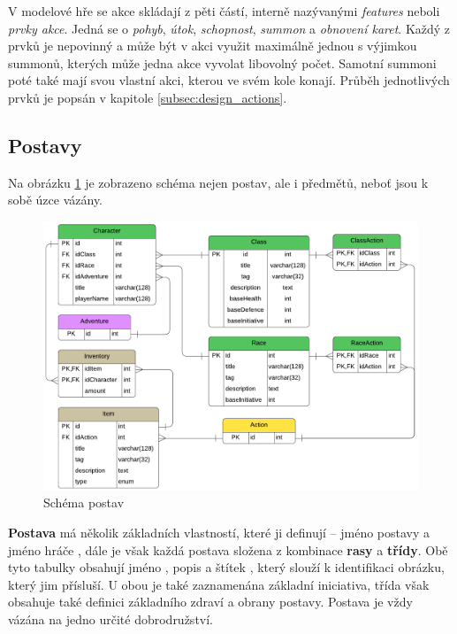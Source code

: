 V modelové hře se akce skládají z pěti částí, interně nazývanými \textit{features} neboli \textit{prvky akce}. Jedná se o \textit{pohyb}, \textit{útok}, \textit{schopnost}, \textit{summon} a \textit{obnovení karet}. Každý z prvků je nepovinný a může být v akci využit maximálně jednou s výjimkou summonů, kterých může jedna akce vyvolat libovolný počet. Samotní summoni poté také mají svou vlastní akci, kterou ve svém kole konají. Průběh jednotlivých prvků je popsán v kapitole \ref{subsec:design_actions}.


\subsection{Postavy}
\label{subsec:schema_character}

Na obrázku \ref{diag:er_character} je zobrazeno schéma nejen postav, ale i předmětů, neboť jsou k sobě úzce vázány. 

\begin{figure}[h]
    \centering
    \includegraphics[width=\textwidth]{../../shared/diagrams/er_character.pdf}
    \caption{Schéma postav}
    \label{diag:er_character}
\end{figure}

\textbf{Postava}  má několik základních vlastností, které ji definují -- jméno postavy  a jméno hráče , dále je však každá postava složena z kombinace \textbf{rasy} a \textbf{třídy}. Obě tyto tabulky obsahují jméno , popis  a štítek , který slouží k identifikaci obrázku, který jim přísluší. U obou je také zaznamenána základní iniciativa, třída však obsahuje také definici základního zdraví a obrany postavy. Postava je vždy vázána na jedno určité dobrodružství.

